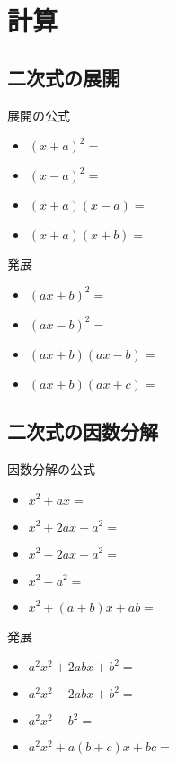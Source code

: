 \documentclass[10pt]{jsarticle}
\begin{document}
\section{計算}
\subsection{二次式の展開}
\begin{itembox}[l]{展開の公式}
	\begin{Large}
		\begin{itemize}
			\item $(x+a)^2=$
			\item $(x-a)^2=$
			\item $(x+a)(x-a)=$
			\item $(x+a)(x+b)=$
		\end{itemize}
	\end{Large}
\end{itembox}

\begin{itembox}[l]{発展}
	\begin{Large}
		\begin{itemize}
			\item $(ax+b)^2=$
			\item $(ax-b)^2=$
			\item $(ax+b)(ax-b)=$
			\item $(ax+b)(ax+c)=$
		\end{itemize}
	\end{Large}
\end{itembox}



\subsection{二次式の因数分解}
\begin{itembox}[l]{因数分解の公式}
	\begin{Large}
		\begin{itemize}
			\item$x^2+ax=$
			\item $x^2+2ax+a^2=$
			\item $x^2-2ax+a^2=$
			\item $x^2-a^2=$
			\item $x^2+(a+b)x+ab=$
		\end{itemize}
	\end{Large}
\end{itembox}

\begin{itembox}[l]{発展}
	\begin{Large}
		\begin{itemize}
			\item $a^2x^2+2abx+b^2=$
			\item $a^2x^2-2abx+b^2=$
			\item $a^2x^2-b^2=$
			\item $a^2x^2+a(b+c)x+bc=$
		\end{itemize}
	\end{Large}
\end{itembox}
\end{document}
